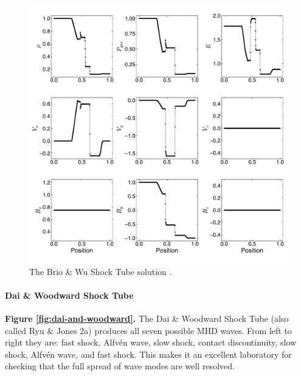 \documentclass[modern, linenumbers]{aastex631}
\newcommand*{\img}[1]{%
    \raisebox{-.3\baselineskip}{%
        \texttt{[image: \#1]}%
    }%
}
\begin{document}
\begin{figure}[ht!]
    \includegraphics[width=\linewidth]{b-and-w.pdf}
    \caption{The Brio \& Wu Shock Tube solution \citep{brio_wu_1988}.
    \href{https://github.com/bcaddy/caddy-et-al-2023/blob/4c9c5ef905902e54e50943d0a261bd5b08342225/python/shock-tubes.py}{\img{github.png}}}
    \label{fig:brio-and-wu}
\end{figure}

\paragraph{Dai \& Woodward Shock Tube}
\textbf{Figure \ref{fig:dai-and-woodward}.}
The Dai \& Woodward Shock Tube (also called Ryu \& Jones 2a) \citep{dai_woodward_1998, ryu_jones_1995} produces all seven possible MHD waves. From left to right they are: fast shock, Alfvén wave, slow shock, contact discontinuity, slow shock, Alfvén wave, and fast shock. This makes it an excellent laboratory for checking that the full spread of wave modes are well resolved.
\end{document}
